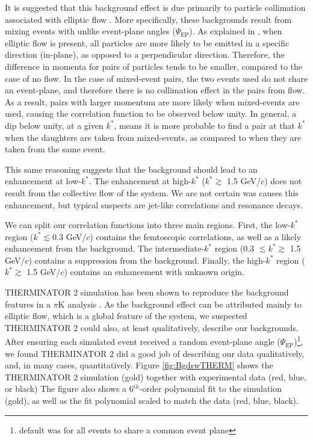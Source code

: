 \documentclass[../AnalysisNoteJBuxton.tex]{subfiles}
\begin{document}
It is suggested that this background effect is due primarily to particle collimation associated with elliptic flow \cite{Kisiel:2017}.  More specifically, these backgrounds result from mixing events with unlike event-plane angles ($\Psi_{\textrm{EP}}$).  As explained in \cite{Kisiel:2017}, when elliptic flow is present, all particles are more likely to be emitted in a specific direction (in-plane), as opposed to a perpendicular direction.  Therefore, the difference in momenta for pairs of particles tends to be smaller, compared to the case of no flow.  In the case of mixed-event pairs, the two events used do not share an event-plane, and therefore there is no collimation effect in the pairs from flow.  As a result, pairs with larger momentum are more likely when mixed-events are used, causing the correlation function to be observed below unity.  In general, a dip below unity, at a given $k^{*}$, means it is more probable to find a pair at that $k^{*}$ when the daughters are taken from mixed-events, as compared to when they are taken from the same event.

This same reasoning suggests that the background should lead to an enhancement at low-$k^{*}$.  The enhancement at high-$k^{*}$ ($k^{*} \gtrsim$ 1.5 GeV/$c$) does not result from the collective flow of the system.  We are not certain was causes this enhancement, but typical suspects are jet-like correlations and resonance decays.

We can split our correlation functions into three main regions.  First, the low-$k^{*}$ region ($k^{*} \lesssim 0.3$ GeV/$c$) contains the femtoscopic correlations, as well as a likely enhancement from the background.  The intermediate-$k^{*}$ region (0.3 $\lesssim k^{*} \gtrsim$ 1.5 GeV/$c$) contains a suppression from the background.  Finally, the high-$k^{*}$ region ($k^{*} \gtrsim$ 1.5 GeV/$c$) contains an enhancement with unknown origin.

THERMINATOR 2 simulation has been shown to reproduce the background features in a $\pi$K analysis \cite{Kisiel:2017}.  As the background effect can be attributed mainly to elliptic flow, which is a global feature of the system, we suspected THERMINATOR 2 could also, at least qualitatively, describe our backgrounds.  After ensuring each simulated event received a random event-plane angle ($\Psi_{\mathrm{EP}}$)\footnote{default was for all events to share a common event plane}, we found THERMINATOR 2 did a good job of describing our data qualitatively, and, in many cases, quantitatively.  Figure \ref{fig:BgdswTHERM} shows the THERMINATOR 2 simulation (gold) together with experimental data (red, blue, or black)  The figure also shows a 6$^{th}$-order polynomial fit to the simulation (gold), as well as the fit polynomial scaled to match the data (red, blue, black).  
\end{document}
